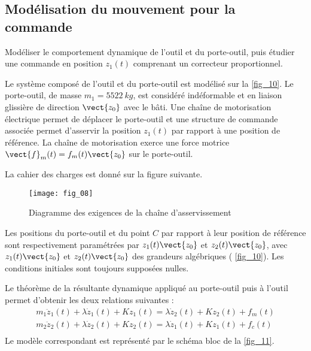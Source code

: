 \ifprof
\else
\begin{multicols}{2}
\fi

\subsection*{Modélisation du mouvement pour la commande}
\begin{obj}
Modéliser le comportement dynamique de l’outil et du porte-outil, puis étudier une commande en
position $z_1(t)$ comprenant un correcteur proportionnel.
\end{obj}

Le système composé de l’outil et du porte-outil est modélisé sur la \autoref{fig_10}. Le porte-outil, de masse $m_1 = \SI{5522}{kg}$,
est considéré indéformable et en liaison glissière de direction $\vect{z_0}$ avec le bâti. Une chaîne de motorisation électrique
permet de déplacer le porte-outil et une structure de commande associée permet d’asservir la position
$z_1(t)$ par rapport à une position de référence. La chaîne de motorisation exerce une force motrice $\vect{f}_m(t) =f_m(t)\vect{z_0}$
sur le porte-outil.

La cahier des charges est donné sur la figure suivante.



\begin{figure}[H]
\centering
\texttt{[image: fig\_08]}
\caption{Diagramme des exigences de la chaîne d'asservissement \label{fig_08}}
\end{figure}




Les positions du porte-outil et du point $C$  par rapport à leur position de référence sont respectivement paramétrées
par $z_1(t)\vect{z_0}$ et $z_2(t)\vect{z_0}$, avec $z_1(t)\vect{z_0}$ et $z_2(t)\vect{z_0}$ des grandeurs algébriques ( \autoref{fig_10}). Les conditions initiales
sont toujours supposées nulles.


Le théorème de la résultante dynamique appliqué au porte-outil puis à l’outil permet d’obtenir les deux relations
suivantes :
$$
\begin{array}{l}
m_1\ddot{z}_1(t)+\lambda\dot{z}_1(t)+Kz_1(t) = \lambda\dot{z}_2(t)+Kz_2(t)+f_m(t) \\
m_2\ddot{z}_2(t)+\lambda\dot{z}_2(t)+Kz_2(t) = \lambda\dot{z}_1(t)+Kz_1(t)+f_c(t) \\
\end{array} $$
Le modèle correspondant est représenté par le schéma bloc de la  \autoref{fig_11}.


\end{multicols}
